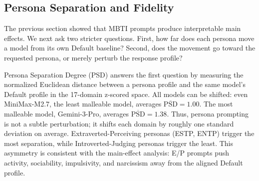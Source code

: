 \documentclass[11pt]{article}
\begin{document}
\subsection{Persona Separation and Fidelity}

The previous section showed that MBTI prompts produce interpretable main effects. We next ask two stricter questions. First, how far does each persona move a model from its own Default baseline? Second, does the movement go toward the requested persona, or merely perturb the response profile?

\begin{table}[t]
\centering
\small
\caption{Persona Separation Degree by model. $\overline{\mathrm{PSD}}$: mean across 16 personas. $\mathrm{PSD}_{\max}$: peak. CV: coefficient of variation.}
\label{tab:psd}
\end{table}

Persona Separation Degree (PSD) answers the first question by measuring the normalized Euclidean distance between a persona profile and the same model's Default profile in the 17-domain z-scored space. All models can be shifted: even MiniMax-M2.7, the least malleable model, averages $\overline{\mathrm{PSD}} = 1.00$. The most malleable model, Gemini-3-Pro, averages $\overline{\mathrm{PSD}} = 1.38$. Thus, persona prompting is not a subtle perturbation; it shifts each domain by roughly one standard deviation on average. Extraverted-Perceiving personas (ESTP, ENTP) trigger the most separation, while Introverted-Judging personas trigger the least. This asymmetry is consistent with the main-effect analysis: E/P prompts push activity, sociability, impulsivity, and narcissism away from the aligned Default profile.
\end{document}
